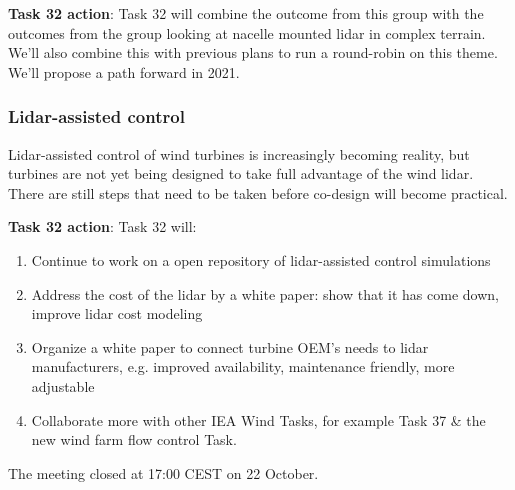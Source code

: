 \begin{taskactions}
\textbf{Task 32 action}: Task 32 will combine the outcome from this group with the outcomes from the group looking at nacelle mounted lidar in complex terrain. We'll also combine this with previous plans to run a round-robin on this theme. We'll propose a path forward in 2021.
\end{taskactions}

\subsubsection{Lidar-assisted control}

Lidar-assisted control of wind turbines is increasingly becoming reality, but turbines are not yet being designed to take full advantage of the wind lidar. There are still steps that need to be taken before co-design will become practical.

\begin{taskactions}
\textbf{Task 32 action}: Task 32 will:
\begin{enumerate}
\item Continue to work on a open repository of lidar-assisted control simulations
\item Address the cost of the lidar by a white paper: show that it has come down, improve lidar cost modeling
\item Organize a white paper to connect turbine OEM's needs to lidar manufacturers, e.g. improved availability, maintenance friendly, more adjustable
\item Collaborate more with other IEA Wind Tasks, for example Task 37 \& the new wind farm flow control Task.
\end{enumerate}
\end{taskactions}


The meeting closed at 17:00 CEST on 22 October.
